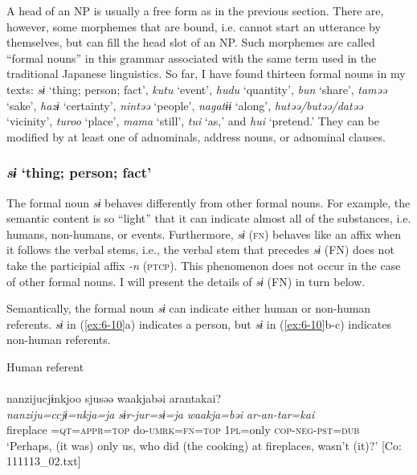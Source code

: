 A head of an NP is usually a free form as in the previous section. There are, however, some morphemes that are bound, i.e. cannot start an utterance by themselves, but can fill the head slot of an NP. Such morphemes are called “formal nouns” in this grammar associated with the same term used in the traditional Japanese linguistics. So far, I have found thirteen formal nouns in my texts: \textit{sɨ} ‘thing; person; fact’, \textit{kutu} ‘event’, \textit{hudu} ‘quantity’, \textit{bun} ‘share’, \textit{taməə} ‘sake’, \textit{hazɨ} ‘certainty’, \textit{nintəə} ‘people’, \textit{nagatɨɨ} ‘along’, \textit{hutəə/butəə/datəə} ‘vicinity’, \textit{turoo} ‘place’, \textit{mama} ‘still’, \textit{tui} ‘as,’ and \textit{hui} ‘pretend.’ They can be modified by at least one of adnominals, address nouns, or adnominal clauses.

\subsubsection{\textit{sɨ} ‘thing; person; fact’}

The formal noun \textit{sɨ} behaves differently from other formal nouns. For example, the semantic content is so “light” that it can indicate almost all of the substances, i.e. humans, non-humans, or events. Furthermore, \textit{sɨ} (\textsc{fn}) behaves like an affix when it follows the verbal stems, i.e., the verbal stem that precedes \textit{sɨ} (FN) does not take the participial affix \textit{-n} (\textsc{ptcp}). This phenomenon does not occur in the case of other formal nouns. I will present the details of \textit{sɨ} (FN) in turn below.

Semantically, the formal noun \textit{sɨ} can indicate either human or non-human referents. \textit{sɨ} in (\ref{ex:6-10}a) indicates a person, but \textit{sɨ} in (\ref{ex:6-10}b-c) indicates non-human referents.

\ea\label{ex:6-10}
 Human referent\\

 \ea{}\\
{\TM}
\glll nanzijucjɨnkjoo  sjusəə  waakjabəi  arantakai?\\
\textit{nanziju=ccjɨ=nkja=ja}  \textit{sɨr-jur=sɨ=ja}  \textit{waakja=bəi}   \textit{ar-an-tar=kai}\\
fireplace =\textsc{qt}=\textsc{appr}=\textsc{top}  do-\textsc{umrk}=\textsc{fn}=\textsc{top}  1\textsc{pl}=only     \textsc{cop}-\textsc{neg}-\textsc{pst}=\textsc{dub}\\
\glt ‘Perhaps, (it was) only us, who did (the cooking) at fireplaces, wasn’t (it)?’ [Co: 111113\_02.txt]

